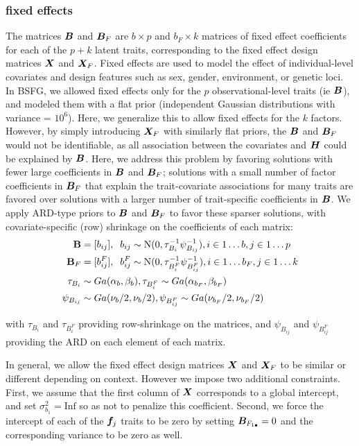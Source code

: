 \documentclass[11pt]{amsart}
\newcommand*{\B}[1]{\ifmmode\bm{#1}\else\textbf{#1}\fi}
\begin{document}
\subsubsection{fixed effects}
The matrices $\B{B}$ and $\B{B}_F$ are $b \times p$ and $b_F \times k$ matrices of fixed effect coefficients for each of the $p + k$ latent traits, corresponding to the fixed effect design matrices $\B{X}$ and $\B{X}_F$. Fixed effects are used to model the effect of individual-level covariates and design features such as sex, gender, environment, or genetic loci. In BSFG, we allowed fixed effects only for the $p$ observational-level traits (ie $\B{B}$), and modeled them with a flat prior (independent Gaussian distributions with variance = $10^6$). Here, we generalize this to allow fixed effects for the $k$ factors. However, by simply introducing $\B{X}_F$ with similarly flat priors, the $\B{B}$ and $\B{B}_F$ would not be identifiable, as all association between the covariates and $\B{H}$ could be explained by $\B{B}$. Here, we address this problem by favoring solutions with fewer large coefficients in $\B{B}$ and $\B{B}_F$; solutions with a small number of factor coefficients in $\B{B}_F$ that explain the trait-covariate associations for many traits are favored over solutions with a larger number of trait-specific coefficients in $\B{B}$. We apply ARD-type priors to $\B{B}$ and $\B{B}_F$ to favor these sparser solutions, with covariate-specific (row) shrinkage on the coefficients of each matrix:
\begin{align}\begin{split}
\B{B} &= [b_{ij}],\;\; b_{ij} \sim \mbox{N}(0,\tau^{-1}_{B_i} \psi^{-1}_{B_{ij}}), i \in 1\dots b, j \in 1\dots p \\
\B{B}_F &= [b^F_{ij}],\;\; b^F_{ij} \sim \mbox{N}(0,\tau^{-1}_{B^F_i} \psi^{-1}_{B^F_{ij}}), i \in 1\dots b_F, j \in 1\dots k\\
\tau_{B_i} &\sim Ga(\alpha_b, \beta_b), \tau_{B^F_i} \sim Ga(\alpha_{b_F}, \beta_{b_F}) \\
\psi_{B_{ij}} &\sim Ga(\nu_b/2, \nu_b/2), \psi_{B^F_{ij}} \sim Ga(\nu_{b_F}/2, \nu_{b_F}/2)
\end{split} \end{align}

\noindent with $\tau_{B_i}$ and $\tau_{B^F_i}$ providing row-shrinkage on the matrices, and $\psi_{B_{ij}}$ and $\psi_{B^F_{ij}}$ providing the ARD on each element of each matrix.

In general, we allow the fixed effect design matrices $\B{X}$ and $\B{X}_F$ to be similar or different depending on context. 
However we impose two additional constraints. First, we assume that the first column of $\B{X}$ corresponds to a global intercept, and set $\sigma^2_{b_1} = \mbox{Inf}$ so as not to penalize this coefficient. 
Second, we force the intercept of each of the $\B{f}_j$ traits to be zero by setting $\B{B}_{F_{1\bullet}} = 0$ and the corresponding variance to be zero as well.
\end{document}
